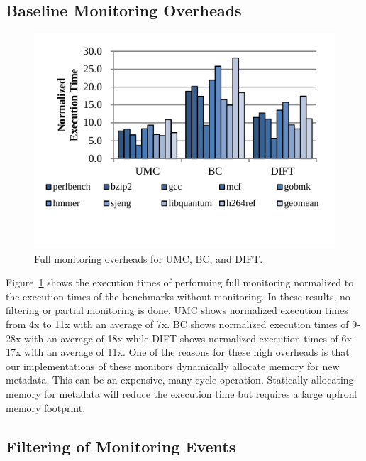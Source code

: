 \subsection{Baseline Monitoring Overheads}
\begin{figure}
  \begin{center}
    \includegraphics[width=\columnwidth]{figs/data_full_mon.pdf}
    \vspace{-0.2in}
    \caption{Full monitoring overheads for UMC, BC, and DIFT.}
    \label{fig:evaluation.full_mon}
    \vspace{-0.1in}
  \end{center}
\end{figure} Figure~\ref{fig:evaluation.full_mon} shows the execution times of
performing full monitoring normalized to the execution times of the benchmarks
without monitoring. In these results, no filtering or partial monitoring is
done. UMC shows normalized execution times from 4x to 11x with an average
of 7x. BC shows normalized execution times of 9-28x with an average of
18x while DIFT shows normalized execution times of 6x-17x with an average of
11x. One of the reasons for these high overheads is that our implementations of
these monitors dynamically allocate memory for new metadata. This can be an
expensive, many-cycle operation. Statically allocating memory for metadata
will reduce the execution time but requires a large upfront memory footprint.

\subsection{Filtering of Monitoring Events}

